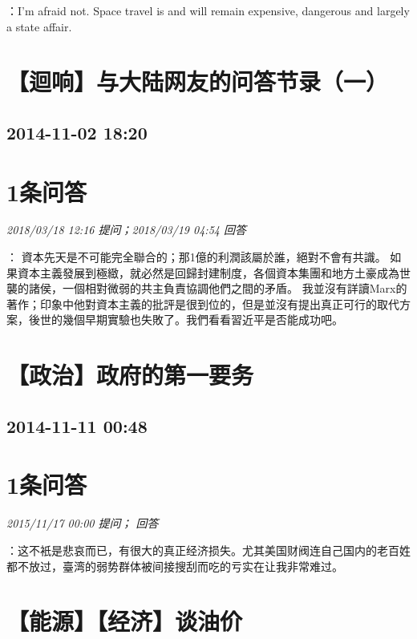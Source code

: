 \documentclass[twocolumn]{ctexart}
\begin{document}
：I'm afraid not. Space travel is and will remain expensive, dangerous and largely a state affair.\\


\section{【迴响】与大陆网友的问答节录（一）}
\subsection{2014-11-02 18:20}


\section{1条问答}

\textit{\hfill\noindent\small 2018/03/18 12:16 提问；2018/03/19 04:54 回答}

：
資本先天是不可能完全聯合的；那1億的利潤該屬於誰，絕對不會有共識。
如果資本主義發展到極緻，就必然是回歸封建制度，各個資本集團和地方土豪成為世襲的諸侯，一個相對微弱的共主負責協調他們之間的矛盾。
我並沒有詳讀Marx的著作；印象中他對資本主義的批評是很到位的，但是並沒有提出真正可行的取代方案，後世的幾個早期實驗也失敗了。我們看看習近平是否能成功吧。
\\


\section{【政治】政府的第一要务 }
\subsection{2014-11-11 00:48}


\section{1条问答}

\textit{\hfill\noindent\small 2015/11/17 00:00 提问； 回答}

：这不衹是悲哀而已，有很大的真正经济损失。尤其美国财阀连自己国内的老百姓都不放过，臺湾的弱势群体被间接搜刮而吃的亏实在让我非常难过。\\


\section{【能源】【经济】谈油价}
\end{document}
